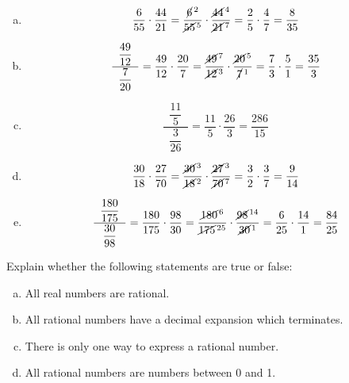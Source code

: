 \documentclass[11pt,letterpaper]{article}
\begin{document}
\sol 
\begin{enumerate}[(a)]
\item 
	\[
	\dfrac{6}{55} \cdot \dfrac{44}{21}= \dfrac{\cancel{6}^{\,2}}{\cancel{55}^{\,5}} \cdot \dfrac{\cancel{44}^{\,4}}{\cancel{21}^{\,7}}= \dfrac{2}{5} \cdot \dfrac{4}{7}= \dfrac{8}{35}
	\] \pspace

\item 
	\[
	\dfrac{\;\;\dfrac{49}{12}\;\;}{\dfrac{7}{20}}= \dfrac{49}{12} \cdot \dfrac{20}{7}= \dfrac{\cancel{49}^{\,7}}{\cancel{12}^{\,3}} \cdot \dfrac{\cancel{20}^{\,5}}{\cancel{7}^{\,1}}= \dfrac{7}{3} \cdot \dfrac{5}{1}= \dfrac{35}{3}
	\] \pspace

\item 
	\[
	\dfrac{\;\;\dfrac{11}{5}\;\;}{\dfrac{3}{26}}= \dfrac{11}{5} \cdot \dfrac{26}{3}= \dfrac{286}{15}
	\] \pspace

\item 
	\[
	\dfrac{30}{18} \cdot \dfrac{27}{70}= \dfrac{\cancel{30}^{\,3}}{\cancel{18}^{\,2}} \cdot \dfrac{\cancel{27}^{\,3}}{\cancel{70}^{\,7}}= \dfrac{3}{2} \cdot \dfrac{3}{7}= \dfrac{9}{14}
	\] \pspace

\item 
	\[
	\dfrac{\;\;\dfrac{180}{175}\;\;}{\dfrac{30}{98}}= \dfrac{180}{175} \cdot \dfrac{98}{30}= \dfrac{\cancel{180}^{\,6}}{\cancel{175}^{\,25}} \cdot \dfrac{\cancel{98}^{\,14}}{\cancel{30}^{\,1}}= \dfrac{6}{25} \cdot \dfrac{14}{1}= \dfrac{84}{25}
	\] 
\end{enumerate}



\newpage



 Explain whether the following statements are true or false:
	\begin{enumerate}[(a)]
	\item All real numbers are rational. 
	\item All rational numbers have a decimal expansion which terminates. 
	\item There is only one way to express a rational number. 
	\item All rational numbers are numbers between 0 and 1. 
	\end{enumerate} \pspace
\end{document}
